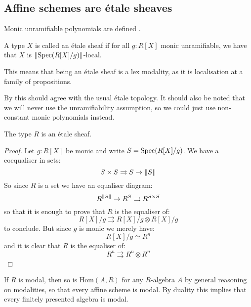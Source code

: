\label{etale-sheaves}

\subsection{Affine schemes are \'etale sheaves}



Monic unramifiable polynomials are defined \cite{wraith79}.

\begin{definition}
A type $X$ is called an \'etale sheaf if for all $g:R[X]$ monic unramifiable, we have that $X$ is $\lVert \operatorname{Spec}(R[X]/g) \rVert$-local.
\end{definition}

This means that being an \'etale sheaf is a lex modality, as it is localisation at a family of propositions. 

\begin{remark}
By \cite{wraith79} this should agree with the usual \'etale topology. It should also be noted that we will never use the unramifiability assumption, so we could just use non-constant monic polynomials instead.
\end{remark}

\begin{lemma}\label{etale-subcanonical}
The type $R$ is an \'etale sheaf.
\end{lemma}

\begin{proof}
Let $g:R[X]$ be monic and write $S=\operatorname{Spec}(R[X]/g)$. We have a coequaliser in sets:
\[S\times S\rightrightarrows S \to \lVert S \rVert\]
So since $R$ is a set we have an equaliser diagram:
\[R^{\lVert S \rVert} \to R^S\rightrightarrows R^{S\times S}\]
so that it is enough to prove that $R$ is the equaliser of:
\[R[X]/g \rightrightarrows R[X]/g \otimes R[X]/g\]
to conclude. But since $g$ is monic we merely have:
\[R[X]/g \simeq R^n\]
and it is clear that $R$ is the equaliser of:
\[R^n \rightrightarrows R^n\otimes R^n\]
\end{proof}

\begin{remark}\label{R-modal-subcanonical}
If $R$ is modal, then so is $\mathrm{Hom}(A,R)$ for any $R$-algebra $A$ by general reasoning on modalities, so that every affine scheme is modal. By duality this implies that every finitely presented algebra is modal.
\end{remark}


